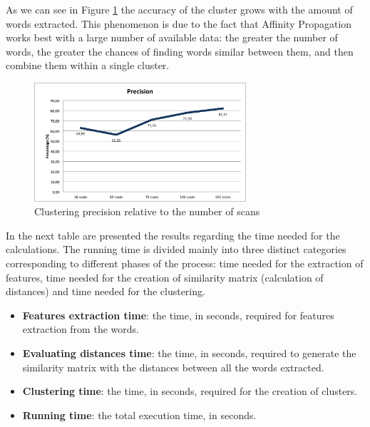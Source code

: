 As we can see in Figure \ref{fig:precision} the accuracy of the cluster grows with the amount of words extracted. This phenomenon is due to the fact that Affinity Propagation works best with a large number of available data: the greater the number of words, the greater the chances of finding words similar between them, and then combine them within a single cluster.


\begin{figure}[H]
\centering
\includegraphics[width=0.7\textwidth]{images/precisione.png}
\caption{Clustering precision relative to the number of scans}
\label{fig:precision}
\end{figure}

In the next table are presented the results regarding the time needed for the calculations. The running time is divided mainly into three distinct categories corresponding to different phases of the process: time needed for the extraction of features, time needed for the creation of similarity matrix (calculation of distances) and time needed for the clustering.

\begin{itemize}
\item \textbf{Features extraction time}: the time, in seconds, required for features extraction from the words.
\item \textbf{Evaluating distances time}: the time, in seconds, required to generate the similarity matrix with the distances between all the words extracted.
\item \textbf{Clustering time}: the time, in seconds, required for the creation of clusters.
\item \textbf{Running time}: the total execution time, in seconds.
\end{itemize}

